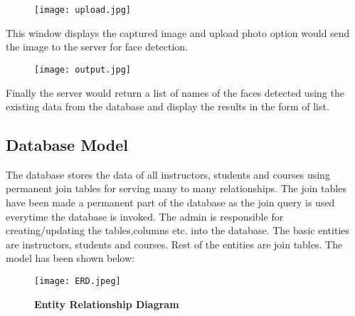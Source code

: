 \documentclass{article}
\begin{document}
\begin{figure}[H]
\begin{center}
\texttt{[image: upload.jpg]}
\label{Fig:diag5_4}
\end{center}
\end{figure}
\begin{center}
{\large This window displays the captured image and upload photo option would send the image to the server for face detection.}
\end{center}

\begin{figure}[H]
\begin{center}
\texttt{[image: output.jpg]}
\label{Fig:diag5_5}
\end{center}
\end{figure}
\begin{center}
{\large Finally the server would return a list of names of the faces detected using the existing data from the database and display the results in the form of list.}
\end{center}
\newpage


\subsection{Database Model} The database stores the data of all instructors, students and courses using permanent join tables for serving many to many relationships. The join tables have been made a permanent part of the database as the join query is used everytime the database is invoked. The admin is responsible for creating/updating the tables,columns etc. into the database. The basic entities are instructors, students and courses. Rest of the entities are join tables. The model has been shown below:

\begin{figure}[H]
\begin{center}
\texttt{[image: ERD.jpeg]}
\caption{\textbf{Entity Relationship Diagram}}
\label{Fig:diag3}
\end{center}
\end{figure}
\end{document}
